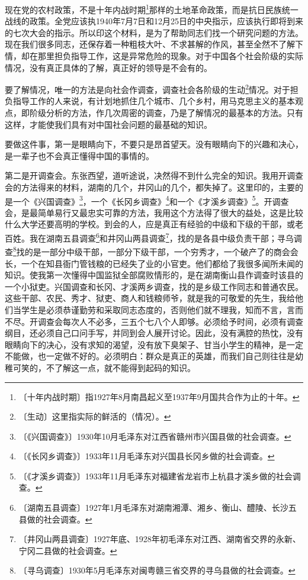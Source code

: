 \documentclass[12pt,UTF-8,openany]{ctexbook}
\begin{document}
\begin{large}
    
    现在党的农村政策，不是十年内战时期\footnote{〔十年内战时期〕指1927年8月南昌起义至1937年9月国共合作为止的十年。}那样的土地革命政策，而是抗日民族统一战线的政策。全党应该执1940年7月7日和12月25日的中央指示，应该执行即将到来的七次大会的指示。所以印这个材料，是为了帮助同志们找一个研究问题的方法。现在我们很多同志，还保存着一种粗枝大叶、不求甚解的作风，甚至全然不了解下情，却在那里担负指导工作，这是异常危险的现象。对于中国各个社会阶级的实际情况，没有真正具体的了解，真正好的领导是不会有的。
    
    要了解情况，唯一的方法是向社会作调查，调查社会各阶级的生动\footnote{〔生动〕这里指实际的鲜活的（情况）。}情况。对于担负指导工作的人来说，有计划地抓住几个城市、几个乡村，用马克思主义的基本观点，即阶级分析的方法，作几次周密的调查，乃是了解情况的最基本的方法。只有这样，才能使我们具有对中国社会问题的最基础的知识。
    
    要做这件事，第一是眼睛向下，不要只是昂首望天。没有眼睛向下的兴趣和决心，是一辈子也不会真正懂得中国的事情的。
    
    第二是开调查会。东张西望，道听途说，决然得不到什么完全的知识。我用开调查会的方法得来的材料，湖南的几个，井冈山的几个，都失掉了。这里印的，主要的是一个《兴国调查》\footnote{〔《兴国调查》〕1930年10月毛泽东对江西省赣州市兴国县做的社会调查。}，一个《长冈乡调查》\footnote{〔《长冈乡调查》〕1933年11月毛泽东对兴国县长冈乡做的社会调查。}和一个《才溪乡调查》\footnote{〔《才溪乡调查》〕1933年11月毛泽东对福建省龙岩市上杭县才溪乡做的社会调查。}。开调查会，是最简单易行又最忠实可靠的方法，我用这个方法得了很大的益处，这是比较什么大学还要高明的学校。到会的人，应是真正有经验的中级和下级的干部，或老百姓。我在湖南五县调查\footnote{〔湖南五县调查〕1927年1月毛泽东对湖南湘潭、湘乡、衡山、醴陵、长沙五县做的社会调查。}和井冈山两县调查\footnote{〔井冈山两县调查〕1927年底、1928年初毛泽东对江西、湖南省交界的永新、宁冈二县做的社会调查。}，找的是各县中级负责干部；寻乌调查\footnote{〔寻乌调查〕1930年5月毛泽东对闽粤赣三省交界的寻乌县做的社会调查。}找的是一部分中级干部，一部分下级干部，一个穷秀才，一个破产了的商会会长，一个在知县衙门管钱粮的已经失了业的小官吏。他们都给了我很多闻所未闻的知识。使我第一次懂得中国监狱全部腐败情形的，是在湖南衡山县作调查时该县的一个小狱吏。兴国调查和长冈、才溪两乡调查，找的是乡级工作同志和普通农民。这些干部、农民、秀才、狱吏、商人和钱粮师爷，就是我的可敬爱的先生，我给他们当学生是必须恭谨勤劳和采取同志态度的，否则他们就不理我，知而不言，言而不尽。开调查会每次人不必多，三五个七八个人即够。必须给予时间，必须有调查纲目，还必须自己口问手写，并同到会人展开讨论。因此，没有满腔的热忱，没有眼睛向下的决心，没有求知的渴望，没有放下臭架子、甘当小学生的精神，是一定不能做，也一定做不好的。必须明白：群众是真正的英雄，而我们自己则往往是幼稚可笑的，不了解这一点，就不能得到起码的知识。
    

\end{large}
\end{document}
